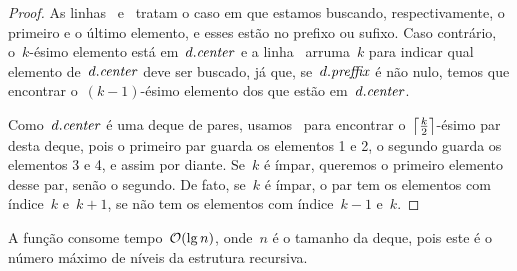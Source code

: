 \documentclass[../../main.tex]{subfiles}
\begin{document}
\begin{proof}
As linhas~ e~ tratam o caso em que estamos buscando, respectivamente, o primeiro e o último elemento, e esses estão no prefixo ou sufixo. Caso contrário, o~$k$-ésimo elemento está em~$d.\V{center}$ e a linha~ arruma~$k$ para indicar qual elemento de~$d.\V{center}$ deve ser buscado, já que, se~$d.\V{preffix}$ é não nulo, temos que encontrar o~$(k-1)$-ésimo elemento dos que estão em~$d.\V{center}$.

Como~$d.\V{center}$ é uma deque de pares, usamos~ para encontrar o~$\ceil*{\frac{k}{2}}$-ésimo par desta deque, pois o primeiro par guarda os elementos 1 e 2, o segundo guarda os elementos 3 e 4, e assim por diante. Se~$k$ é ímpar, queremos o primeiro elemento desse par, senão o segundo. De fato, se~$k$ é ímpar, o par tem os elementos com índice~$k$ e~$k+1$, se não tem os elementos com índice~$k-1$ e~$k$.
\end{proof}

A função consome tempo~$\Oh(\lg n)$, onde~$n$ é o tamanho da deque, pois este é o número máximo de níveis da estrutura recursiva.
\end{document}
